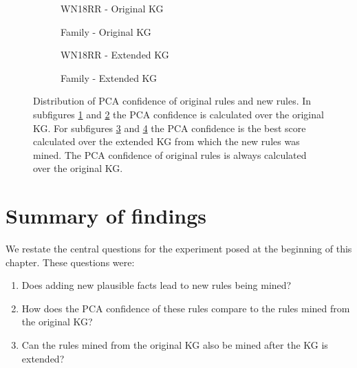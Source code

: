 \begin{figure}[htbp]
\centering
\begin{subfigure}{.49\textwidth}
  \centering
    
    \caption{WN18RR - Original KG}
  \label{fig:PCA_rule_dist_new_original_wn18rr_sub}
\end{subfigure}
\begin{subfigure}{.49\textwidth}
  \centering
    
    \caption{Family - Original KG}
  \label{fig:PCA_rule_dist_new_original_family_sub}
\end{subfigure}
\begin{subfigure}{.49\textwidth}
  \centering
    
    \caption{WN18RR - Extended KG}
  \label{fig:_PCA_rule_dist_new_original_wn18rr_sub}
\end{subfigure}%
\begin{subfigure}{.49\textwidth}
  \centering
    
    \caption{Family - Extended KG}
  \label{fig:_PCA_rule_dist_new_original_family_sub}
\end{subfigure}
\caption[PCA conf. dist. of new and original rules.]{Distribution of PCA confidence of original rules and new rules. In subfigures \ref{fig:PCA_rule_dist_new_original_wn18rr_sub} and \ref{fig:PCA_rule_dist_new_original_family_sub} the PCA confidence is calculated over the original KG. For subfigures \ref{fig:_PCA_rule_dist_new_original_wn18rr_sub} and \ref{fig:_PCA_rule_dist_new_original_family_sub} the PCA confidence is the best score calculated over the extended KG from which the new rules was mined. The PCA confidence of original rules is always calculated over the original KG.}
\label{fig:PCA_rule_dist_new_original}
\end{figure}


\section{Summary of findings}
\label{results_summary}
We restate the central questions for the experiment posed at the beginning of this chapter. These questions were:
\begin{enumerate}
    \item Does adding new plausible facts lead to new rules being mined? 
    \item How does the PCA confidence of these rules compare to the rules mined from the original KG?
    \item Can the rules mined from the original KG also be mined after the KG is extended?
\end{enumerate}

